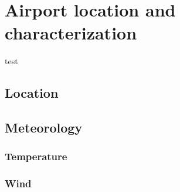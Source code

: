 \chapter{Airport location and characterization}
test

	\section{Location}

	\section{Meteorology}
		\subsection{Temperature}
		\subsection{Wind}